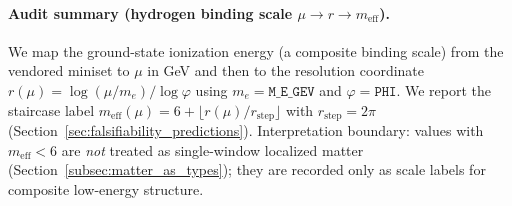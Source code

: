 \paragraph{Audit summary (hydrogen binding scale $\mu\to r\to m_{\mathrm{eff}}$).} \AuditTag We map the ground-state ionization energy (a composite binding scale) from the vendored miniset to $\mu$ in GeV and then to the resolution coordinate $r(\mu)=\log(\mu/m_e)/\log\varphi$ using $m_e=\texttt{M\_E\_GEV}$ and $\varphi=\texttt{PHI}$. We report the staircase label $m_{\mathrm{eff}}(\mu)=6+\lfloor r(\mu)/r_{\mathrm{step}}\rfloor$ with $r_{\mathrm{step}}=2\pi$ (Section~\ref{sec:falsifiability_predictions}). Interpretation boundary: values with $m_{\mathrm{eff}}<6$ are \emph{not} treated as single-window localized matter (Section~\ref{subsec:matter_as_types}); they are recorded only as scale labels for composite low-energy structure.